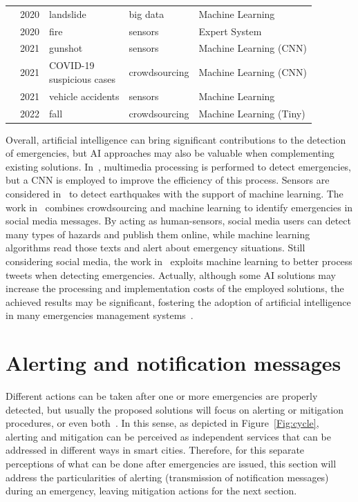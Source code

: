 \begin{refsection}
\begin{table}
{\begin{tabular}{lllll}
    \citeauthor{BRAGAGNOLO2020104240} & 2020 & landslide & big data & Machine Learning \\
    \citeauthor{ExpertFire1} & 2020 & fire & sensors & Expert System \\
    \citeauthor{cnn2} & 2021 & gunshot & sensors & Machine Learning (CNN) \\
    \citeauthor{MachineCovidVoice} & 2021 & \makecell[l]{COVID-19\\suspicious cases} & crowdsourcing & Machine Learning (CNN) \\
    \citeauthor{MachineVehicleAccident} & 2021 & vehicle accidents & sensors & Machine Learning \\
    \citeauthor{TinyMachineFall} & 2022 & fall & crowdsourcing & Machine Learning (Tiny) \\
    \hline
  \end{tabular}
  }
\end{table}

Overall, artificial intelligence can bring significant contributions to the detection of emergencies, but AI approaches may also be valuable when complementing existing solutions. In~\cite{visualdataEmergency4}, multimedia processing is performed to detect emergencies, but a CNN is employed to improve the efficiency of this process. Sensors are considered in~\cite{iotEarthquake2} to detect earthquakes with the support of machine learning. The work in~\cite{Alkhatib2019771} combines crowdsourcing and machine learning to identify emergencies in social media messages. By acting as human-sensors, social media users can detect many types of hazards and publish them online, while machine learning algorithms read those texts and alert about emergency situations. Still considering social media, the work in~\cite{twitter3} exploits machine learning to better process tweets when detecting emergencies. Actually, although some AI solutions may increase the processing and implementation costs of the employed solutions, the achieved results may be significant, fostering the adoption of artificial intelligence in many emergencies management systems~\cite{surveyAI1,surveyAI2,iaHumanCentered}.

\section{Alerting and notification messages}\label{sec5}

Different actions can be taken after one or more emergencies are properly detected, but usually the proposed solutions will focus on alerting or mitigation procedures, or even both~\cite{architecture1,emergenciesmetric2}. In this sense, as depicted in Figure~\ref{Fig:cycle}, alerting and mitigation can be perceived as independent services that can be addressed in different ways in smart cities. Therefore, for this separate perceptions of what can be done after emergencies are issued, this section will address the particularities of alerting (transmission of notification messages) during an emergency, leaving mitigation actions for the next section. 


\end{refsection}

